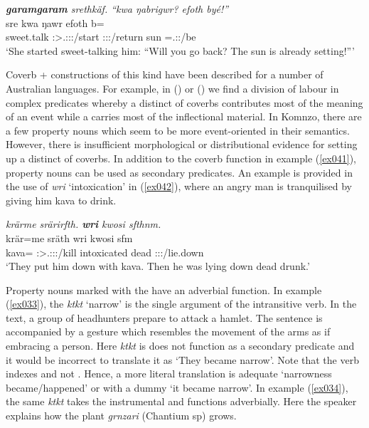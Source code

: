 \begin{exe}
	\ex \emph{\textbf{garamgaram} srethkäf. ``kwa ŋabrigwr? efoth byé!''}\\
	 sre kwa ŋawr efoth b=\\
	sweet.talk \Stsg:\Sbj>\Tsg.\Masc:\Obj:\Irr:\Pfv/start {\Fut} \Stsg:\Sbj:\Nonpast:\Ipfv/return sun \Med{}=\Tsg.\Masc:\Nonpast:\Ipfv/be\\
	\trans `She started sweet-talking him: ``Will you go back? The sun is already setting!''' 
	\label{ex041}
\end{exe}

Coverb +  constructions of this kind have been described for a number of Australian languages. For example, in  (\citealt{SchultzeBerndt:2000wk}) or  (\citealt{Meakins:ul}) we find a division of labour in complex predicates whereby a distinct  of coverbs contributes most of the meaning of an event while a  carries most of the inflectional material. In Komnzo, there are a few property nouns which seem to be more event-oriented in their semantics. However, there is insufficient morphological or distributional evidence for setting up a distinct  of coverbs. In addition to the coverb function in example (\ref{ex041}), property nouns can be used as secondary predicates. An example is provided in the use of \emph{wri} `intoxication' in (\ref{ex042}), where an angry man is tranquilised by giving him kava to drink.

\begin{exe}
	\ex \emph{krärme srärirfth. \textbf{wri} kwosi sfthnm.}\\
	\gll krär=me sräth wri kwosi sfm\\
	kava={\Ins} \Stpl:\Sbj>\Tsg.\Masc:\Obj:\Irr:\Pfv/kill intoxicated dead \Tsg\Masc:\Sbj:\Pst:\Dur/lie.down\\
	\trans `They put him down with kava. Then he was lying down dead drunk.'\\ 
	\label{ex042}
\end{exe}

Property nouns marked with the   have an adverbial function. In example (\ref{ex033}), the  \emph{ktkt} `narrow' is the single argument of the intransitive verb. In the text, a group of headhunters prepare to attack a hamlet. The sentence is accompanied by a gesture which resembles the movement of the arms as if embracing a person. Here \emph{ktkt} is does not function as a secondary predicate and it would be incorrect to translate it as `They became narrow'. Note that the verb indexes \Stsg{} and not \Stnsg{}. Hence, a more literal translation is adequate `narrowness became/happened' or with a dummy  `it became narrow'. In example (\ref{ex034}), the same  \emph{ktkt} takes the instrumental  and functions adverbially. Here the speaker explains how the plant \emph{grnzari} (Chantium sp) grows.

